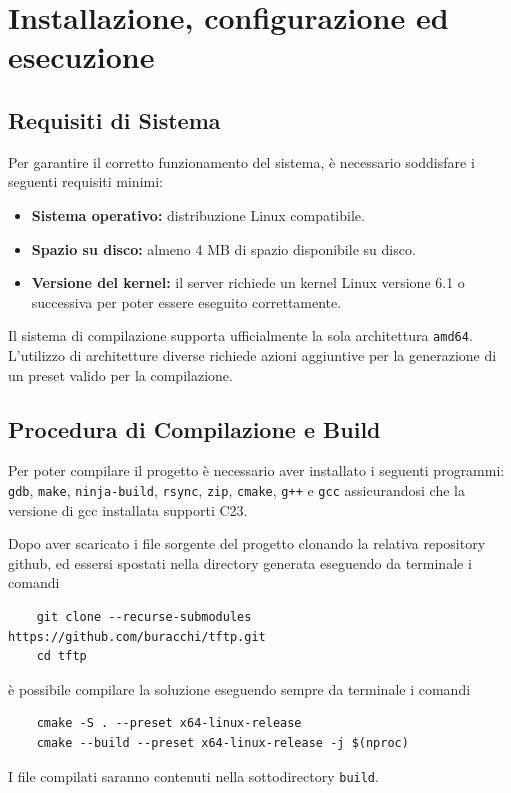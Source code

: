 \documentclass[12pt]{article}
\begin{document}
\section{Installazione, configurazione ed esecuzione} {


\subsection{Requisiti di Sistema}

Per garantire il corretto funzionamento del sistema, è necessario soddisfare i seguenti requisiti minimi:

\begin{itemize}
    \item \textbf{Sistema operativo:} distribuzione Linux compatibile.
    \item \textbf{Spazio su disco:} almeno 4 MB di spazio disponibile su disco.
    \item \textbf{Versione del kernel:} il server richiede un kernel Linux versione 6.1 o successiva per poter essere eseguito correttamente.
\end{itemize}

Il sistema di compilazione supporta ufficialmente la sola architettura \texttt{amd64}.
L'utilizzo di architetture diverse richiede azioni aggiuntive per la generazione di un preset valido per la compilazione.

\subsection{Procedura di Compilazione e Build}

Per poter compilare il progetto è necessario aver installato i seguenti programmi: \texttt{gdb}, \texttt{make}, \texttt{ninja-build}, \texttt{rsync}, \texttt{zip}, \texttt{cmake}, \texttt{g++} e \texttt{gcc} assicurandosi che la versione di gcc installata supporti C23.

Dopo aver scaricato i file sorgente del progetto clonando la relativa repository github, ed essersi spostati nella directory generata eseguendo da terminale i comandi
\begin{verbatim}
    git clone --recurse-submodules https://github.com/buracchi/tftp.git
    cd tftp
\end{verbatim}
è possibile compilare la soluzione eseguendo sempre da terminale i comandi
\begin{verbatim}
    cmake -S . --preset x64-linux-release
    cmake --build --preset x64-linux-release -j $(nproc)
\end{verbatim}
I file compilati saranno contenuti nella sottodirectory \texttt{build}. 

}
\end{document}
